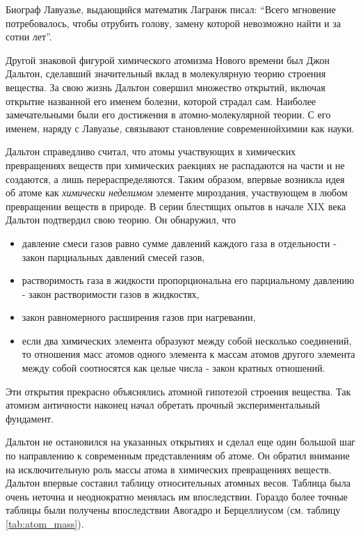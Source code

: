 Биограф Лавуазье, выдающийся математик Лагранж писал: ``Всего мгновение потребовалось, чтобы отрубить голову, замену которой невозможно найти и за сотни лет''.

Другой знаковой фигурой химического атомизма Нового времени был Джон Дальтон, сделавший значительный вклад в молекулярную теорию строения вещества.
За свою жизнь Дальтон совершил множество открытий, включая открытие названной его именем болезни, которой страдал сам.
Наиболее замечательными были его достижения в атомно-молекулярной теории.
С его именем, наряду с Лавуазье, связывают становление  современнойхимии как науки.

Дальтон справедливо считал, что атомы участвующих в химических превращениях веществ при химических раекциях не распадаются на части и не создаются, а лишь перераспределяются. 
Таким образом, впервые возникла идея об атоме как \textit{химически неделимом} элементе мироздания, участвующем в любом превращении веществ в природе.
В серии блестящих опытов в начале XIX века Дальтон подтвердил свою теорию.
Он обнаружил, что
\begin{itemize}
    \item давление смеси газов равно сумме давлений каждого газа в отдельности - закон парциальных давлений смесей газов,
    \item растворимость газа в жидкости пропорциональна его парциальному давлению - закон растворимости газов в жидкостях,
    \item закон равномерного расширения газов при нагревании,
    \item если два химических элемента образуют между собой несколько соединений, то отношения масс атомов одного элемента к массам атомов другого элемента между собой соотносятся как целые числа - закон кратных отношений.
\end{itemize}
Эти открытия прекрасно объяснялись атомной гипотезой строения вещества.
Так атомизм античности наконец начал обретать прочный экспериментальный фундамент.

Дальтон не остановился на указанных открытиях и сделал еще один большой шаг по направлению к современным представлениям об атоме.
Он обратил внимание на исключительную роль массы атома в химических превращениях веществ.
Дальтон впервые составил таблицу относительных атомных весов.
Таблица была очень неточна и неоднократно менялась им впоследствии.
Гораздо более точные таблицы были получены впоследствии Авогадро и Берцеллиусом (см. таблицу \ref{tab:atom_mass}).

